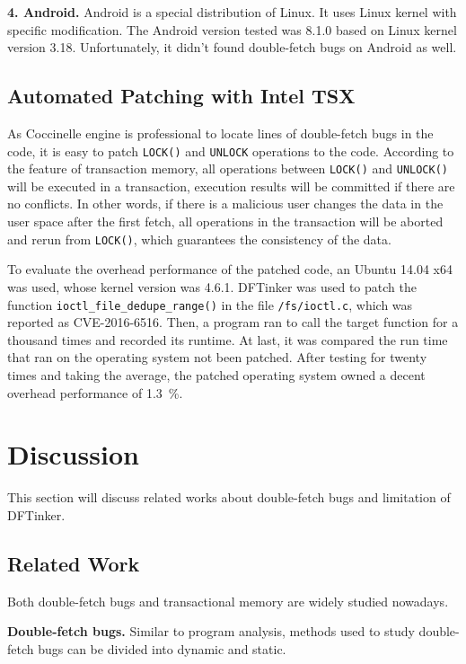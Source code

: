\documentclass[10pt]{llncs}
\begin{document}
\textbf{4. Android.}
Android is a special distribution of Linux. It uses Linux kernel with specific modification. The Android version tested was 8.1.0 based on Linux kernel version 3.18. Unfortunately, it didn't found double-fetch bugs on Android as well.

\subsection{Automated Patching with Intel TSX}
\label{evalue2}

As Coccinelle engine is professional to locate lines of double-fetch bugs in the code, it is easy to patch \verb:LOCK(): and \verb:UNLOCK: operations to the code. According to the feature of transaction memory, all operations between \verb:LOCK(): and \verb:UNLOCK(): will be executed in a transaction, execution results will be committed if there are no conflicts. In other words, if there is a malicious user changes the data in the user space after the first fetch, all operations in the transaction will be aborted and rerun from \verb:LOCK():, which guarantees the consistency of the data.

To evaluate the overhead performance of the patched code, an Ubuntu 14.04 x64 was used, whose kernel version was 4.6.1. DFTinker was used to patch the function \verb:ioctl_file_dedupe_range(): in the file \verb:/fs/ioctl.c:, which was reported as CVE-2016-6516. Then, a program ran to call the target function for a thousand times and recorded its runtime. At last, it was compared the run time that ran on the operating system not been patched. After testing for twenty times and taking the average, the patched operating system owned a decent overhead performance of 1.3~\%.

\section{Discussion}%
\label{discuss}

This section will discuss related works about double-fetch bugs and limitation of DFTinker.
\subsection{Related Work}
\label{discuss1}

Both double-fetch bugs and transactional memory are widely studied nowadays.

\textbf{Double-fetch bugs.} Similar to program analysis, methods used to study double-fetch bugs can be divided into dynamic and static.
\end{document}

